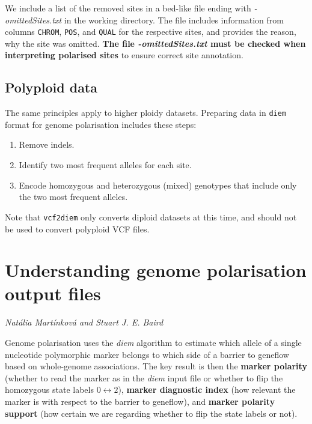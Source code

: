\documentclass[
]{book}
\providecommand{\tightlist}{%
  \setlength{\itemsep}{0pt}\setlength{\parskip}{0pt}}
\begin{document}
We include a list of the removed sites in a bed-like file ending with \emph{-omittedSites.txt} in the working directory. The file includes information from columns \texttt{CHROM}, \texttt{POS}, and \texttt{QUAL} for the respective sites, and provides the reason, why the site was omitted. \textbf{The file \emph{-omittedSites.txt} must be checked when interpreting polarised sites} to ensure correct site annotation.

\section{Polyploid data}\label{polyploid-data}

The same principles apply to higher ploidy datasets. Preparing data in \texttt{diem} format for genome polarisation includes these steps:

\begin{enumerate}
\def\labelenumi{\arabic{enumi}.}
\tightlist
\item
  Remove indels.
\item
  Identify two most frequent alleles for each site.
\item
  Encode homozygous and heterozygous (mixed) genotypes that include only the two most frequent alleles.
\end{enumerate}

Note that \texttt{vcf2diem} only converts diploid datasets at this time, and should not be used to convert polyploid VCF files.

\chapter{Understanding genome polarisation output files}\label{understanding-genome-polarisation-output-files}

\emph{Natália Martínková and Stuart J. E. Baird}

Genome polarisation \citep{Baird2023} uses the \emph{diem} algorithm to estimate which allele of a single nucleotide polymorphic marker belongs to which side of a barrier to geneflow based on whole-genome associations. The key result is then the \textbf{marker polarity} (whether to read the marker as in the \emph{diem} input file or whether to flip the homozygous state labels \(0 \leftrightarrow 2\)), \textbf{marker diagnostic index} (how relevant the marker is with respect to the barrier to geneflow), and \textbf{marker polarity support} (how certain we are regarding whether to flip the state labels or not).
\end{document}
